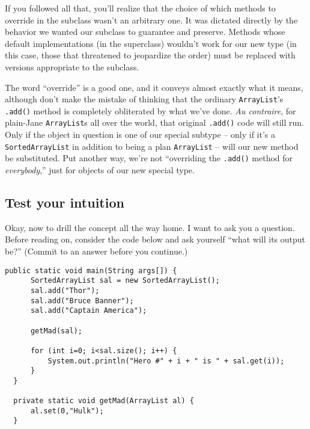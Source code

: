 If you followed all that, you'll realize that the choice of which methods to
override in the subclass wasn't an arbitrary one. It was dictated directly by
the behavior we wanted our subclass to guarantee and preserve. Methods whose
default implementations (in the superclass) wouldn't work for our new type (in
this case, those that threatened to jeopardize the order) must be replaced
with versions appropriate to the subclass.

The word ``override'' is a good one, and it conveys almost exactly what it
means, although don't make the mistake of thinking that the ordinary
\texttt{ArrayList}'s \texttt{.add()} method is completely obliterated by what
we've done. \textit{Au contraire}, for plain-Jane \texttt{ArrayList}s all over
the world, that original \texttt{.add()} code will still run. Only if the
object in question is one of our special subtype -- only if it's a
\texttt{SortedArrayList} in addition to being a plan \texttt{ArrayList} --
will our new method be substituted. Put another way, we're not ``overriding
the \texttt{.add()} method for \textit{everybody},'' just for objects of our
new special type.

\subsection{Test your intuition}

\begin{samepage}
Okay, now to drill the concept all the way home. I want to ask you a question.
Before reading on, consider the code below and ask yourself ``what will its
output be?'' (Commit to an answer before you continue.)

\begin{Verbatim}[fontsize=\footnotesize,samepage=true,frame=single]
  public static void main(String args[]) {
      SortedArrayList sal = new SortedArrayList();
      sal.add("Thor");
      sal.add("Bruce Banner");
      sal.add("Captain America");
  
      getMad(sal);
  
      for (int i=0; i<sal.size(); i++) {
          System.out.println("Hero #" + i + " is " + sal.get(i));
      }
  }

  private static void getMad(ArrayList al) {
      al.set(0,"Hulk");
  }
\end{Verbatim}
\end{samepage}

